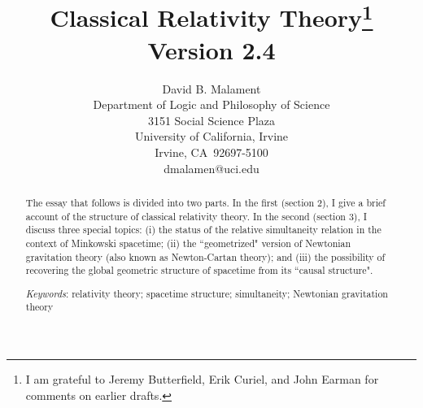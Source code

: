 \documentclass [12] {article}
\theoremstyle{plain}
\numberwithin{figure}{subsection}
\numberwithin{proposition}{subsection}
\begin{document}
\title{\huge{\textbf{Classical Relativity Theory}}\thanks{I am grateful to Jeremy Butterfield, Erik Curiel, and  John Earman for comments on earlier drafts.} \\  \vspace{.1in}
\normalsize{Version 2.4} 
}



\author{{David B. Malament} \\ \normalsize{Department of Logic and Philosophy of Science} \\ \normalsize{3151 Social Science Plaza} \\ \normalsize{University of
California, Irvine} \\ \normalsize{Irvine, CA\ 92697-5100} \\ \normalsize{dmalamen@uci.edu}\\
 } 
\date{}

\maketitle

\thispagestyle{fancy}

\begin{abstract}
The essay that follows is divided into two parts. In the first (section 2), I give a brief account of the structure of  classical relativity theory. In the second (section 3), I discuss three special topics:  (i) the status of the relative simultaneity relation in the context of Minkowski spacetime; (ii)  the ``geometrized" version of Newtonian gravitation theory (also known as Newton-Cartan theory); and (iii) the possibility of recovering the global geometric structure of spacetime from its ``causal structure".  

\vspace{1em}

\noindent \emph{Keywords}:  relativity theory; spacetime structure; simultaneity; Newtonian gravitation theory
\end{abstract}

\newpage
\tableofcontents


\newpage
\end{document}
